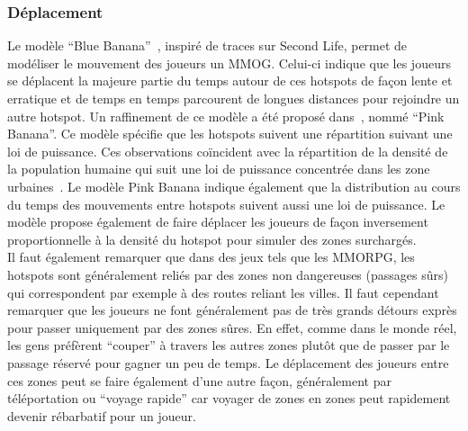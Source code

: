 \subsubsection{Déplacement}
Le modèle ``Blue Banana''~\cite{blue_banana}, inspiré de traces sur Second Life, permet de modéliser le mouvement des joueurs un MMOG. Celui-ci indique que les joueurs se déplacent la majeure partie du temps autour de ces hotspots de façon lente et erratique et de temps en temps parcourent de longues distances pour rejoindre un autre hotspot. Un raffinement de ce modèle a été proposé dans~\cite{these_raluca}, nommé ``Pink Banana''. Ce modèle spécifie que les hotspots suivent une répartition suivant une loi de puissance. Ces observations coïncident avec la répartition de la densité de la population humaine qui suit une loi de puissance concentrée dans les zone urbaines~\cite{population_reelle}. Le modèle Pink Banana indique également que la distribution au cours du temps des mouvements entre hotspots suivent aussi une loi de puissance. Le modèle propose également de faire déplacer les joueurs de façon inversement proportionnelle à la densité du hotspot pour simuler des zones surchargés.\\

Il faut également remarquer que dans des jeux tels que les MMORPG, les hotspots sont généralement reliés par des zones non dangereuses (passages sûrs) qui correspondent par exemple à des routes reliant les villes. Il faut cependant remarquer que les joueurs ne font généralement pas de très grands détours exprès pour passer uniquement par des zones sûres. En effet, comme dans le monde réel, les gens préfèrent ``couper'' à travers les autres zones plutôt que de passer par le passage réservé pour gagner un peu de temps. Le déplacement des joueurs entre ces zones peut se faire également d'une autre façon, généralement par téléportation ou ``voyage rapide'' car voyager de zones en zones peut rapidement devenir rébarbatif pour un joueur.\\

